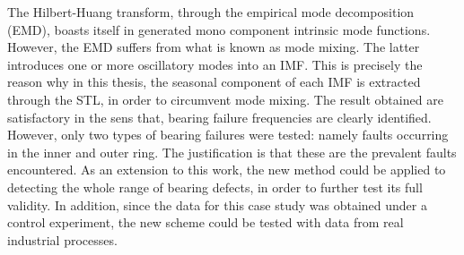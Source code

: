 \documentclass[../Main/thesis.tex]{subfiles}
\begin{document}
	\justify
	The Hilbert-Huang transform, through the empirical mode decomposition (EMD), boasts itself in generated mono component intrinsic mode functions. However, the EMD suffers from what is known as mode mixing. The latter introduces one or more oscillatory modes into an IMF. This is precisely the reason why in this thesis, the seasonal component of each IMF is extracted through the STL, in order to circumvent mode mixing.
	\justify
	The result obtained are satisfactory in the sens that, bearing failure frequencies are clearly identified. However, only two types of bearing failures were tested: namely faults occurring in the inner and outer ring. The justification is that these are the prevalent faults encountered. As an extension to this work, the new method could be applied to detecting the whole range of bearing defects, in order to further test its full validity. In addition, since the data for this case study was obtained under a control experiment, the new scheme could be tested with data from real industrial processes.

	
\end{document}
